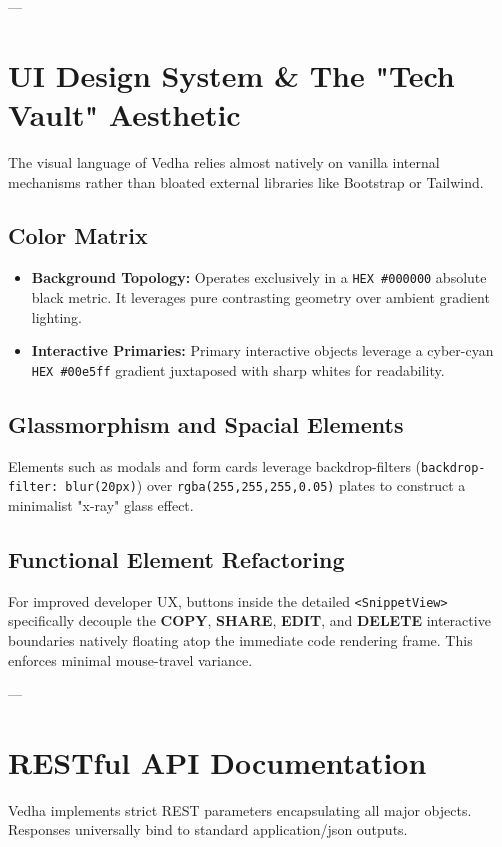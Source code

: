 \documentclass[12pt,a4paper]{article}
\begin{document}
---

\section{UI Design System \& The "Tech Vault" Aesthetic}

The visual language of Vedha relies almost natively on vanilla internal mechanisms rather than bloated external libraries like Bootstrap or Tailwind.

\subsection{Color Matrix}
\begin{itemize}
    \item \textbf{Background Topology:} Operates exclusively in a \texttt{HEX \#000000} absolute black metric. It leverages pure contrasting geometry over ambient gradient lighting.
    \item \textbf{Interactive Primaries:} Primary interactive objects leverage a cyber-cyan \texttt{HEX \#00e5ff} gradient juxtaposed with sharp whites for readability.
\end{itemize}

\subsection{Glassmorphism and Spacial Elements}
Elements such as modals and form cards leverage backdrop-filters (\texttt{backdrop-filter: blur(20px)}) over \texttt{rgba(255,255,255,0.05)} plates to construct a minimalist "x-ray" glass effect.

\subsection{Functional Element Refactoring}
For improved developer UX, buttons inside the detailed \texttt{<SnippetView>} specifically decouple the \textbf{COPY}, \textbf{SHARE}, \textbf{EDIT}, and \textbf{DELETE} interactive boundaries natively floating atop the immediate code rendering frame. This enforces minimal mouse-travel variance.

---

\section{RESTful API Documentation}
Vedha implements strict REST parameters encapsulating all major objects. Responses universally bind to standard application/json outputs.
\end{document}
